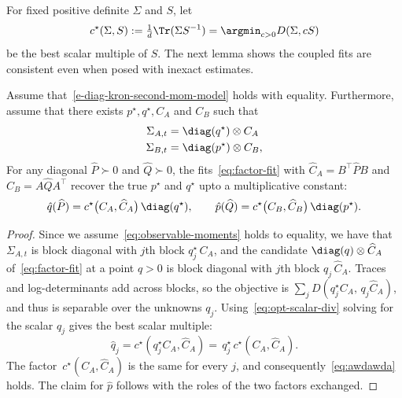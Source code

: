 For fixed positive definite $\Sigma$ and $S$, let
\begin{equation} \label{eq:opt-scalar-div}
c^\star(\Sigma,S) := \tfrac{1}{d}\Tr(\Sigma S^{-1}) =\argmin_{c>0}D(\Sigma,cS)\end{equation}
be the best scalar multiple
of $S$.
The
next lemma shows the coupled fits are consistent even when posed with
inexact estimates.
\begin{lemma}[Consistency]\label{lem:consistency}
Assume that~\eqref{e-diag-kron-second-mom-model}  holds with equality. Furthermore, assume that there exists $p^\star, q^\star, C_A$ and $C_B$ such that
\begin{align}
  \Sigma_{A,t} & =   \diag(q^\star) \otimes C_{A} \nonumber \\
  \Sigma_{B,t}&=  \diag(p^\star) \otimes C_{B}, \label{eq:observable-moments-lem}
\end{align}
For any
diagonal $\widehat P\succ0$ and $\widehat Q\succ0$, the
fits~\eqref{eq:factor-fit}  with $\widehat C_A=B^\top\widehat PB$
and $\widehat C_B=A\widehat QA^\top$ recover the true $p^\star$ and $q^\star$ upto a multiplicative constant:
\begin{equation} \label{eq:awdawda}
  \hat{q}(\widehat P)= c^\star\big(C_A,\widehat C_A\big)\,\diag(q^\star),
  \qquad
  \hat{p}(\widehat Q)= c^\star\big(C_B,\widehat C_B\big)\,\diag(p^\star).
\end{equation}
\end{lemma}
\begin{proof}
Since we assume~\eqref{eq:observable-moments} holds to equality, we have that $\Sigma_{A,t}$ is block
diagonal with $j$th block $ q_j^\star\,C_A$, and the candidate
$\diag(q)\otimes\widehat C_A$ of~\eqref{eq:factor-fit} at a point $q>0$
is block diagonal with $j$th block $q_j\,\widehat C_A$. Traces and
log-determinants add across blocks, so the objective is
$\sum_jD(  q^\star_jC_A,\,q_j\widehat C_A)$, and thus is separable 
over the unknowns $q_j$. Using~\eqref{eq:opt-scalar-div} solving for the scalar $q_j$ gives the best scalar
multiple:
\[
\hat{q}_j=c^\star( q^\star_jC_A,\widehat C_A)
=\,q^\star_j\,c^\star(C_A,\widehat C_A).
\]
The factor
$\,c^\star(C_A,\widehat C_A)$ is the same for every $j$, and consequently~\eqref{eq:awdawda} holds. The claim
for $\hat{p}$ follows with the roles of the two factors exchanged.
\end{proof}



